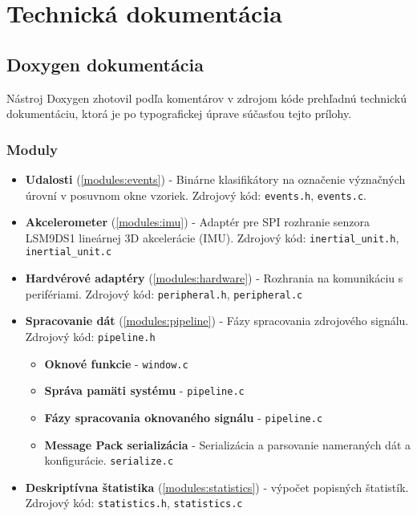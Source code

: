 \thispagestyle{empty}
\chapter{Technická dokumentácia}
\renewcommand*{\thepage}{B-\arabic{page}}

\section{Doxygen dokumentácia}
Nástroj Doxygen zhotovil podľa komentárov v zdrojom kóde prehľadnú technickú dokumentáciu,
ktorá je po typografickej úprave súčasťou tejto prílohy.

\subsection{Moduly}
\begin{itemize}[noitemsep, topsep=0pt]
	\item \textbf{Udalosti} (\ref{modules:events}) - Binárne klasifikátory na označenie význačných úrovní v posuvnom okne vzoriek. 
	Zdrojový kód: \verb|events.h|, \verb|events.c|.
	\item \textbf{Akcelerometer} (\ref{modules:imu}) - Adaptér pre SPI rozhranie senzora LSM9DS1 lineárnej 3D akcelerácie (IMU).
	Zdrojový kód: \verb|inertial_unit.h|, \verb|inertial_unit.c|
	\item \textbf{Hardvérové adaptéry} (\ref{modules:hardware}) - Rozhrania na komunikáciu s perifériami.
	Zdrojový kód: \verb|peripheral.h|, \verb|peripheral.c|
	\item \textbf{Spracovanie dát} (\ref{modules:pipeline}) - Fázy spracovania zdrojového signálu. Zdrojový kód: \verb|pipeline.h|
	\begin{itemize}[noitemsep, topsep=0pt]
		\item \textbf{Oknové funkcie} - \verb|window.c|
		\item \textbf{Správa pamäti systému} - \verb|pipeline.c|
		\item \textbf{Fázy spracovania oknovaného signálu} - \verb|pipeline.c|
		\item \textbf{Message Pack serializácia} - Serializácia a parsovanie nameraných dát a konfigurácie. \verb|serialize.c|
	\end{itemize}
	\item \textbf{Deskriptívna štatistika} (\ref{modules:statistics}) - výpočet popisných štatistík. Zdrojový kód: \verb|statistics.h|, \verb|statistics.c|
\end{itemize}


